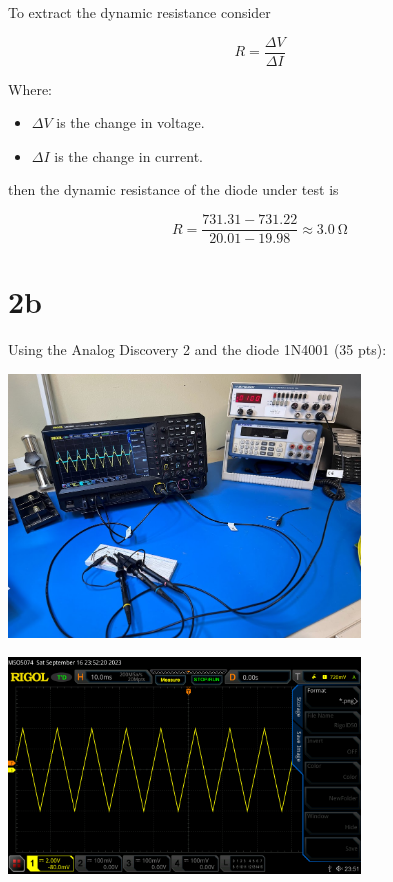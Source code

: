 \documentclass{article}
\begin{document}
	To extract the dynamic resistance consider
	
	\[
		R = \frac{\Delta V}{\Delta I}
	\]

	Where:
	\begin{itemize}
		\item $\Delta V$ is the change in voltage.
		\item $\Delta I$ is the change in current.
	\end{itemize}
	
	then the dynamic resistance of the diode under test is 
	 
	\[
		R = \frac{731.31 - 731.22}{20.01 - 19.98} \approx \SI{3.0}{\ohm}
	\]
	
	\section*{2b}
	
	Using the Analog Discovery 2 and the diode 1N4001 (35 pts):


	\begin{center}
	\includegraphics[width=0.7\textwidth]{diode-setup}
	\end{center}

	\begin{center}
	\includegraphics[width=0.7\textwidth]{diode1}
	\end{center}
\end{document}
